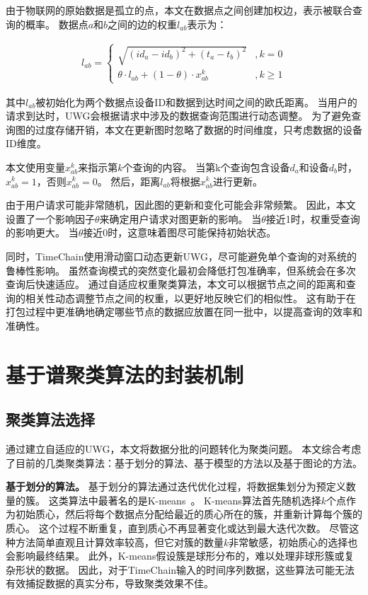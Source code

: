 由于物联网的原始数据是孤立的点，本文在数据点之间创建加权边，表示被联合查询的概率。
数据点$a$和$b$之间的边的权重$l_{ab}$表示为：

\begin{equation} 
    \label{eq:weight}
    \begin{split}
        l_{ab} =
        \begin{cases}
            \sqrt{ (id_a - id_b)^2 + (t_a - t_b)^2 } &, k = 0 \\  
            \theta \cdot l_{ab} + (1 - \theta) \cdot x_{ab}^k &, k \geq 1  
        \end{cases}
    \end{split}
\end{equation}

其中$l_{ab}$被初始化为两个数据点设备ID和数据到达时间之间的欧氏距离。
当用户的请求到达时，UWG会根据请求中涉及的数据查询范围进行动态调整。
为了避免查询图的过度存储开销，本文在更新图时忽略了数据的时间维度，只考虑数据的设备ID维度。

本文使用变量$x_{ab}^k$来指示第$k$个查询的内容。
当第k个查询包含设备$d_a$和设备$d_b$时，$x_{ab}^k=1$，否则$x_{ab}^k=0$。
然后，距离$l_{ab}$将根据$x_{ab}^k$进行更新。

由于用户请求可能非常随机，因此图的更新和变化可能会非常频繁。
因此，本文设置了一个影响因子$\theta$来确定用户请求对图更新的影响。
当$\theta$接近1时，权重受查询的影响更大。
当$\theta$接近0时，这意味着图尽可能保持初始状态。

同时，TimeChain使用滑动窗口动态更新UWG，尽可能避免单个查询的对系统的鲁棒性影响。
虽然查询模式的突然变化最初会降低打包准确率，但系统会在多次查询后快速适应。
通过自适应权重聚类算法，本文可以根据节点之间的距离和查询的相关性动态调整节点之间的权重，以更好地反映它们的相似性。
这有助于在打包过程中更准确地确定哪些节点的数据应放置在同一批中，以提高查询的效率和准确性。

\section{基于谱聚类算法的封装机制}
\label{sec:ratiocut}

\subsection{聚类算法选择}
通过建立自适应的UWG，本文将数据分批的问题转化为聚类问题。
本文综合考虑了目前的几类聚类算法：基于划分的算法、基于模型的方法以及基于图论的方法。

\textbf{基于划分的算法。}
基于划分的算法通过迭代优化过程，将数据集划分为预定义数量的簇。
这类算法中最著名的是K-means~\cite{kanungo2002efficient}。
K-means算法首先随机选择$k$个点作为初始质心，然后将每个数据点分配给最近的质心所在的簇，并重新计算每个簇的质心。
这个过程不断重复，直到质心不再显著变化或达到最大迭代次数。
尽管这种方法简单直观且计算效率较高，但它对簇的数量$k$非常敏感，初始质心的选择也会影响最终结果。
此外，K-means假设簇是球形分布的，难以处理非球形簇或复杂形状的数据。
因此，对于TimeChain输入的时间序列数据，这些算法可能无法有效捕捉数据的真实分布，导致聚类效果不佳。

